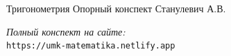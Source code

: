 \documentclass{umk-matematika}
\begin{document}
\maketitlepage
    {Тригонометрия}
    {Опорный конспект}
    {Станулевич А.В.}

\begin{center}
\vspace{1.5cm}
\textit{Полный конспект на сайте:}\\
\texttt{https://umk-matematika.netlify.app}
\end{center}
\end{document}
